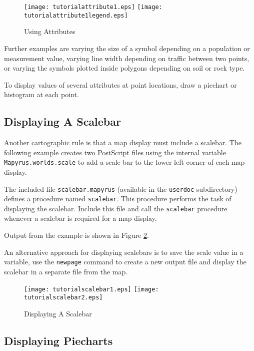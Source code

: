

\begin{figure}[htb]
\texttt{[image: tutorialattribute1.eps]}
\texttt{[image: tutorialattribute1legend.eps]}
\caption{Using Attributes}
\label{tutorialattribute1}
\end{figure}

Further examples are varying the size of a symbol depending on a
population or measurement value, varying line width depending on
traffic between two points, or varying the symbols plotted inside
polygons depending on soil or rock type.

To display values of several attributes at point locations, draw a
piechart or histogram at each point.

\subsection{Displaying A Scalebar}
\label{tutorialscalebar}

Another cartographic rule is that a map display must include a scalebar.  The
following example creates two PostScript files using the internal variable
\texttt{Mapyrus.worlds.scale} to add a scale bar to the lower-left corner
of each map display.

The included file \texttt{scalebar.mapyrus} (available in the \texttt{userdoc}
subdirectory) defines a procedure named \texttt{scalebar}.  This procedure
performs the task of displaying the scalebar.  Include this file and call the
\texttt{scalebar} procedure whenever a scalebar is required for a map display.

Output from the example is shown in Figure \ref{tutorialscalebar1}.

An alternative approach for displaying scalebars is to save the scale value in
a variable, use the \texttt{newpage} command to create a new output file and
display the scalebar in a separate file from the map.



\begin{figure}[htb]
\texttt{[image: tutorialscalebar1.eps]}
\texttt{[image: tutorialscalebar2.eps]}
\caption{Displaying A Scalebar}
\label{tutorialscalebar1}
\end{figure}

\subsection{Displaying Piecharts}


